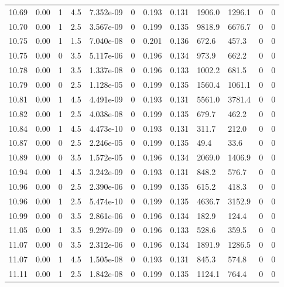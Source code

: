 \documentclass[preview]{standalone}
\begin{document}
{{{{{{{{{{{\begin{tabular}{L{1.2cm}C{1.2cm} C{0.3cm}C{0.5cm} C{1.4cm}C{1.4cm} C{1.4cm}C{1.4cm} C{1.6cm}C{1.6cm} C{1.6cm}C{1.6cm}}
  10.69  &  0.00  & 1     & 4.5 &  7.352e-09  & 0  &  0.193&   0.131& 1906.0 & 1296.1   &  0 & 0  \\ 
  10.70  &  0.00  & 1     & 2.5 &  3.567e-09  & 0  &  0.199&   0.135& 9818.9 & 6676.7   &  0 & 0  \\ 
  10.75  &  0.00  & 1     & 1.5 &  7.040e-08  & 0  &  0.201&   0.136& 672.6 & 457.3   &  0 & 0  \\ 
  10.75  &  0.00  & 0     & 3.5 &  5.117e-06  & 0  &  0.196&   0.134& 973.9 & 662.2   &  0 & 0  \\ 
  10.78  &  0.00  & 1     & 3.5 &  1.337e-08  & 0  &  0.196&   0.133& 1002.2 & 681.5   &  0 & 0  \\ 
  10.79  &  0.00  & 0     & 2.5 &  1.128e-05  & 0  &  0.199&   0.135& 1560.4 & 1061.1   &  0 & 0  \\ 
  10.81  &  0.00  & 1     & 4.5 &  4.491e-09  & 0  &  0.193&   0.131& 5561.0 & 3781.4   &  0 & 0  \\ 
  10.82  &  0.00  & 1     & 2.5 &  4.038e-08  & 0  &  0.199&   0.135& 679.7 & 462.2   &  0 & 0  \\ 
  10.84  &  0.00  & 1     & 4.5 &  4.473e-10  & 0  &  0.193&   0.131& 311.7 & 212.0   &  0 & 0  \\ 
  10.87  &  0.00  & 0     & 2.5 &  2.246e-05  & 0  &  0.199&   0.135& 49.4 & 33.6   &  0 & 0  \\ 
  10.89  &  0.00  & 0     & 3.5 &  1.572e-05  & 0  &  0.196&   0.134& 2069.0 & 1406.9   &  0 & 0  \\ 
  10.94  &  0.00  & 1     & 4.5 &  3.242e-09  & 0  &  0.193&   0.131& 848.2 & 576.7   &  0 & 0  \\ 
  10.96  &  0.00  & 0     & 2.5 &  2.390e-06  & 0  &  0.199&   0.135& 615.2 & 418.3   &  0 & 0  \\ 
  10.96  &  0.00  & 1     & 2.5 &  5.474e-10  & 0  &  0.199&   0.135& 4636.7 & 3152.9   &  0 & 0  \\ 
  10.99  &  0.00  & 0     & 3.5 &  2.861e-06  & 0  &  0.196&   0.134& 182.9 & 124.4   &  0 & 0  \\ 
  11.05  &  0.00  & 1     & 3.5 &  9.297e-09  & 0  &  0.196&   0.133& 528.6 & 359.5   &  0 & 0  \\ 
  11.07  &  0.00  & 0     & 3.5 &  2.312e-06  & 0  &  0.196&   0.134& 1891.9 & 1286.5   &  0 & 0  \\ 
  11.07  &  0.00  & 1     & 4.5 &  1.505e-08  & 0  &  0.193&   0.131& 845.3 & 574.8   &  0 & 0  \\ 
  11.11  &  0.00  & 1     & 2.5 &  1.842e-08  & 0  &  0.199&   0.135& 1124.1 & 764.4   &  0 & 0  \\ 

\end{tabular}}}}}}}}}}}}
\end{document}
